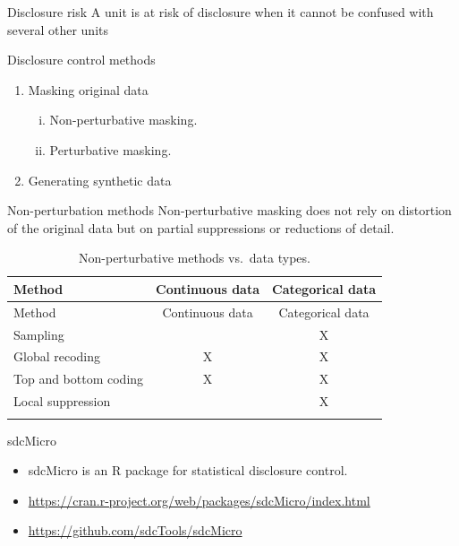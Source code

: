 \documentclass[
  ignorenonframetext,
  aspectratio=169,
]{beamer}
\providecommand{\tightlist}{%
  \setlength{\itemsep}{0pt}\setlength{\parskip}{0pt}}\usepackage{longtable,booktabs,array}
\begin{document}
\begin{frame}{Disclosure risk}
\protect\hypertarget{disclosure-risk}{}
A unit is at risk of disclosure when it cannot be confused with several
other units
\end{frame}

\begin{frame}{Disclosure control methods}
\protect\hypertarget{disclosure-control-methods}{}
\begin{enumerate}
\tightlist
\item
  Masking original data

  \begin{enumerate}
  [i.]
  \tightlist
  \item
    Non-perturbative masking.
  \item
    Perturbative masking.
  \end{enumerate}
\item
  Generating synthetic data
\end{enumerate}
\end{frame}

\begin{frame}{Non-perturbation methods}
\protect\hypertarget{non-perturbation-methods}{}
Non-perturbative masking does not rely on distortion of the original
data but on partial suppressions or reductions of detail.

\begin{longtable}[]{@{}lcc@{}}
\caption{Non-perturbative methods vs.~data types.}\tabularnewline
\toprule\noalign{}
Method & Continuous data & Categorical data \\
\midrule\noalign{}
\endfirsthead
\toprule\noalign{}
Method & Continuous data & Categorical data \\
\midrule\noalign{}
\endhead
Sampling & & X \\
Global recoding & X & X \\
Top and bottom coding & X & X \\
Local suppression & & X \\
\bottomrule\noalign{}
\end{longtable}
\end{frame}

\begin{frame}{sdcMicro}
\protect\hypertarget{sdcmicro}{}
\begin{itemize}
\item
  sdcMicro is an R package for statistical disclosure control.
\item
  \url{https://cran.r-project.org/web/packages/sdcMicro/index.html}
\item
  \url{https://github.com/sdcTools/sdcMicro}
\end{itemize}
\end{frame}
\end{document}
